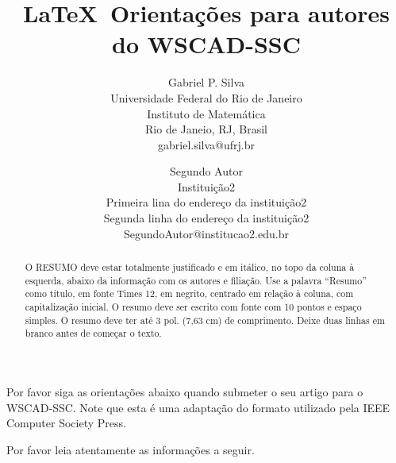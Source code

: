\documentclass[10pt,twocolumn]{article}
\begin{document}
\title{\LaTeX\ Orientações para autores do WSCAD-SSC }

\author{Gabriel P. Silva\\
Universidade Federal do Rio de Janeiro\\ Instituto de Matemática \\ Rio de Janeio, RJ, Brasil \\ gabriel.silva@ufrj.br\\
\and
Segundo Autor\\
Instituição2\\
Primeira lina do endereço da instituição2\\ Segunda linha do endereço da instituição2\\ 
SegundoAutor@institucao2.edu.br\\
}

\maketitle
\thispagestyle{empty}

\begin{abstract}
   O RESUMO deve estar totalmente justificado e em itálico, 
   no topo da coluna à esquerda, abaixo da informação com os autores
   e filiação.  Use a palavra ``Resumo'' como título, em fonte Times 12, 
   em negrito, centrado em relação à coluna, com capitalização
   inicial. O resumo deve ser escrito com fonte com 10 pontos e  
   espaço simples. O resumo deve ter até 3 pol. (7,63 cm) de 
   comprimento. Deixe duas linhas em branco antes de começar
   o texto. 
\end{abstract}




Por favor siga as orientações abaixo quando submeter 
o seu artigo para o WSCAD-SSC. Note que esta é uma adaptação
do formato utilizado pela IEEE Computer Society Press. 


Por favor leia atentamente as informações a seguir.
\end{document}
